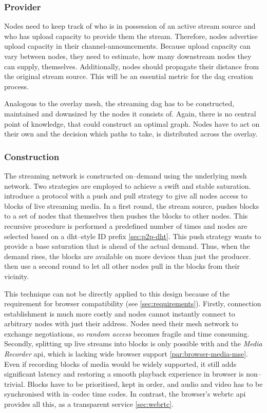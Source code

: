 \subsubsection{Provider}\label{sec:design-stream-provider}
Nodes need to keep track of who is in possession of an active stream source and who has upload capacity to provide them the stream. Therefore, nodes advertise upload capacity in their \glspl{channel-announcement}. Because upload capacity can vary between nodes, they need to estimate, how many downstream nodes they can supply, themselves. Additionally, nodes should propagate their distance from the original stream source. This will be an essential metric for the \gls{dag} creation process.

Analogous to the overlay mesh, the streaming \gls{dag} has to be constructed, maintained and downsized by the nodes it consists of. Again, there is no central point of knowledge, that could construct an optimal graph. Nodes have to act on their own and the decision which paths to take, is distributed across the overlay.

\subsubsection{Construction}\label{sec:design-stream-construction}
The streaming network is constructed on–demand using the underlying mesh network. Two strategies are employed to achieve a swift and stable saturation.
\citet*[\S3]{push-to-pull} introduce a protocol with a push and pull strategy to give all nodes access to blocks of live streaming media. In a first round, the stream source, pushes blocks to a set of nodes that themselves then pushes the blocks to other nodes. This recursive procedure is performed a predefined number of times and nodes are selected based on a \gls{dht}–style ID prefix \cref{sec:p2p-dht}. This push strategy wants to provide a base saturation that is ahead of the actual demand. Thus, when the demand rises, the blocks are available on more devices than just the producer. \citet{push-to-pull} then use a second round to let all other nodes pull in the blocks from their vicinity.

This technique can not be directly applied to this design because of the requirement for browser compatibility (see \vref{sec:requirements}). Firstly, connection establishment is much more costly and nodes cannot instantly connect to arbitrary nodes with just their address. Nodes need their mesh network to exchange negotiations, so \textit{random access} becomes fragile and time consuming.
Secondly, splitting up live streams into blocks is only possible with  and the \textit{Media Recorder} \gls{api}, which is lacking wide browser support \cref{par:browser-media-mse}. Even if recording blocks of media would be widely supported, it still adds significant latency and restoring a smooth playback experience in browser is non–trivial. Blocks have to be prioritised, kept in order, and audio and video has to be synchronised with in–codec time codes.
In contrast, the browser's \gls{webrtc} \gls{api} provides all this, as a transparent service \ref{sec:webrtc}.


